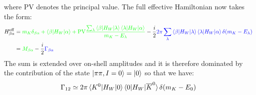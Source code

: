 \documentclass[../main.tex]{subfiles}
\begin{document}
where PV denotes the principal value. The full effective Hamiltonian now takes the form:
\begin{align*}
H_{\beta\alpha}^{\text{eff}}&={\color{green}{m_K\delta_{\beta\alpha}+\braket{\beta|H_W|\alpha}+\text{PV}\frac{\sum_\lambda\braket{\beta|H_W|\lambda}\braket{\lambda|H_W|\alpha}}{m_K-E_\lambda}}}-\frac{i}{2}{\color{blue}{2\pi\sum_\lambda\braket{\beta|H_W|\lambda}\braket{\lambda|H_W|\alpha}\delta(m_K-E_\lambda)}}\\
&={\color{green}{M_{\beta\alpha}}}-\frac{i}{2}{\color{blue}{\Gamma_{\beta\alpha}}}
\end{align*}
The sum is extended over on-shell amplitudes and it is therefore dominated by the contribution of the state $\ket{\pi\pi,I=0}=\ket{0}$ so that we have:
\[
\Gamma_{12}\simeq2\pi\braket{K^0|H_W|0}\braket{0|H_W|\overline{K}^0}\delta(m_K-E_0)
\]
\end{document}
